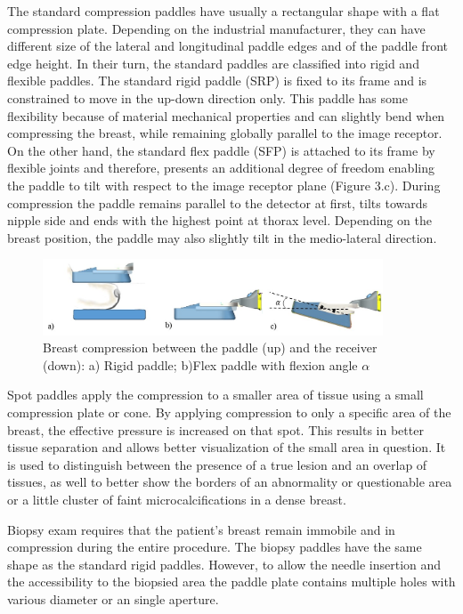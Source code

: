  The standard compression paddles have usually a rectangular shape with a flat compression plate. Depending on the industrial manufacturer, they can have different size of the lateral and longitudinal paddle edges and of the paddle front edge height.  In their turn, the standard paddles are classified into rigid and flexible paddles. The standard rigid paddle (SRP) is fixed to its frame and is constrained to move in the up-down direction only. This paddle has some flexibility because of material mechanical properties and can slightly bend when compressing the breast, while remaining globally  parallel to the image receptor. On the other hand, the standard flex paddle (SFP)  is attached to its frame by flexible joints and therefore, presents an additional degree of freedom enabling the paddle to tilt with respect to the image receptor plane (Figure 3.c). During compression the paddle remains parallel to the detector at
first, tilts towards nipple side and ends with the highest point at
thorax level. Depending on the breast position, the paddle may also slightly tilt in the medio-lateral direction.

\begin{figure}[!h]
\centering
\includegraphics[width=0.9\textwidth,keepaspectratio]{figures/compressionpaddles.jpg} 
\caption{Breast compression between the paddle (up) and the receiver (down): a) Rigid paddle; b)Flex paddle with flexion angle $\alpha$}\label{fig:compressionpaddles}
\end{figure}


 Spot paddles apply the compression to a smaller area of tissue using a small compression plate or cone. By applying compression to only a specific area of the breast, the effective pressure is increased on that spot. This results in better tissue separation and allows better visualization of the small area in question.  It is used to distinguish between the presence of a true lesion and an overlap of tissues, as well to better show the borders of an abnormality or questionable area or a little cluster of faint microcalcifications in a dense breast.  

Biopsy exam requires that the patient's breast remain immobile and in compression during the entire procedure. The biopsy paddles have the same shape as the standard rigid paddles. However, to allow the needle insertion and the accessibility to the biopsied area the paddle plate contains multiple holes with various diameter or an single aperture. 

